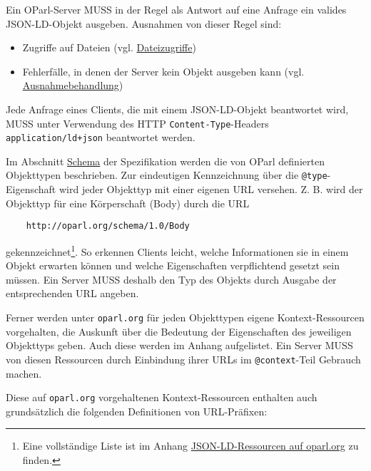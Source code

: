 \documentclass[,a4paper]{article}
\begin{document}
Ein OParl-Server MUSS in der Regel als Antwort auf eine Anfrage ein
valides JSON-LD-Objekt ausgeben. Ausnahmen von dieser Regel sind:

\begin{itemize}
\itemsep1pt\parskip0pt
\item
  Zugriffe auf Dateien (vgl. \hyperref[dateizugriff]{Dateizugriffe})
\item
  Fehlerfälle, in denen der Server kein Objekt ausgeben kann (vgl.
  \hyperref[ausnahmebehandlung]{Ausnahmebehandlung})
\end{itemize}

Jede Anfrage eines Clients, die mit einem JSON-LD-Objekt beantwortet
wird, MUSS unter Verwendung des HTTP \texttt{Content-Type}-Headers
\texttt{application/ld+json} beantwortet werden.

Im Abschnitt \hyperref[schema]{Schema} der Spezifikation werden die von
OParl definierten Objekttypen beschrieben. Zur eindeutigen Kennzeichnung
über die \texttt{@type}-Eigenschaft wird jeder Objekttyp mit einer
eigenen URL versehen. Z. B. wird der Objekttyp für eine Körperschaft
(Body) durch die URL

\begin{verbatim}
    http://oparl.org/schema/1.0/Body
\end{verbatim}

gekennzeichnet\footnote{Eine vollständige Liste ist im Anhang
  \hyperref[jsonldux5fressourcenux5foparlorg]{JSON-LD-Ressourcen auf
  oparl.org} zu finden.}. So erkennen Clients leicht, welche
Informationen sie in einem Objekt erwarten können und welche
Eigenschaften verpflichtend gesetzt sein müssen. Ein Server MUSS deshalb
den Typ des Objekts durch Ausgabe der entsprechenden URL angeben.

Ferner werden unter \texttt{oparl.org} für jeden Objekttypen eigene
Kontext-Ressourcen vorgehalten, die Auskunft über die Bedeutung der
Eigenschaften des jeweiligen Objekttyps geben. Auch diese werden im
Anhang aufgelistet. Ein Server MUSS von diesen Ressourcen durch
Einbindung ihrer URLs im \texttt{@context}-Teil Gebrauch machen.

Diese auf \texttt{oparl.org} vorgehaltenen Kontext-Ressourcen enthalten
auch grundsätzlich die folgenden Definitionen von URL-Präfixen:
\end{document}
